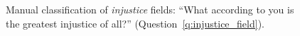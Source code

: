 \begin{figure}[h!]
    \caption[Manual classification of \textit{injustice} fields]{Manual classification of \textit{injustice} fields: ``What according to you is the greatest injustice of all?'' (Question~\ref{q:injustice_field}).
    }\label{fig:injustice_field}
\end{figure}

